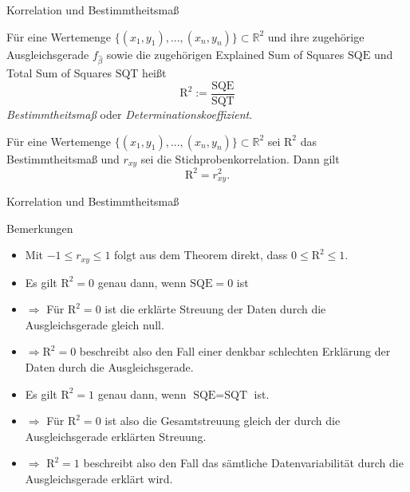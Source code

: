 \documentclass[
  8pt,
  ignorenonframetext,
]{beamer}
\begin{document}
\begin{frame}{Korrelation und Bestimmtheitsmaß}
\protect\hypertarget{korrelation-und-bestimmtheitsmauxdf-8}{}
\footnotesize
\begin{definition}
\justifying
Für eine Wertemenge $\{(x_1,y_1), ..., (x_n,y_n)\} \subset \mathbb{R}^2$ und ihre
zugehörige Ausgleichsgerade $f_{\hat{\beta}}$ sowie die zugehörigen Explained Sum of Squares $\mbox{SQE}$
und Total Sum of Squares $\mbox{SQT}$ heißt
\begin{equation}
\mbox{R}^2 := \frac{\mbox{SQE}}{\mbox{SQT}}
\end{equation}
\textit{Bestimmtheitsmaß} oder \textit{Determinationskoeffizient}.
\end{definition}

\begin{theorem}
\justifying
\normalfont
Für eine Wertemenge $\{(x_1,y_1), ..., (x_n,y_n)\} \subset \mathbb{R}^2$ sei
$\mbox{R}^2$ das Bestimmtheitsmaß und $r_{xy}$ sei die Stichprobenkorrelation.
Dann gilt
\begin{equation}
\mbox{R}^2 = r_{xy}^2.
\end{equation}
\end{theorem}
\end{frame}

\begin{frame}{Korrelation und Bestimmtheitsmaß}
\protect\hypertarget{korrelation-und-bestimmtheitsmauxdf-9}{}
\footnotesize


Bemerkungen

\begin{itemize}
\item  Mit $-1 \le r_{xy} \le 1$ folgt aus dem Theorem direkt, dass $0 \le \mbox{R}^2 \le 1$.
\item  Es gilt $\mbox{R}^2 = 0$ genau dann, wenn $\mbox{SQE} = 0$ ist
\item[] $\Rightarrow$ Für $\mbox{R}^2 = 0$ ist die erklärte Streuung der Daten durch die Ausgleichsgerade gleich null.
\item[] $\Rightarrow$$\mbox{R}^2 = 0$ beschreibt also den Fall einer denkbar schlechten Erklärung der Daten durch die Ausgleichsgerade.
\item Es gilt $\mbox{R}^2 = 1$ genau dann, wenn $\mbox{SQE} = \mbox{SQT}$ ist.
\item[] $\Rightarrow$ Für $\mbox{R}^2 = 0$ ist also die Gesamtstreuung gleich der durch die Ausgleichsgerade erklärten Streuung.
\item[] $\Rightarrow$ $\mbox{R}^2 = 1$ beschreibt also den Fall das sämtliche Datenvariabilität durch die Ausgleichsgerade erklärt wird.
\end{itemize}
\end{frame}
\end{document}

